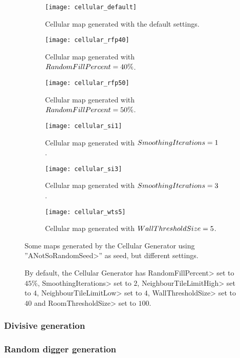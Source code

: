 \begin{figure}[tp]
	\centering
  	\begin{subfigure}[t]{0.325\linewidth}
		\texttt{[image: cellular\_default]}
     		\caption{Cellular map generated with the default settings.}
 	\end{subfigure}
  	\begin{subfigure}[t]{0.325\linewidth}
    		\texttt{[image: cellular\_rfp40]}
    		\caption{Cellular map generated with $Ran\-dom\-Fill\-Per\-cent = 40\%$.}
  	\end{subfigure}
  	\begin{subfigure}[t]{0.325\linewidth}
    		\texttt{[image: cellular\_rfp50]}
    		\caption{Cellular map generated with $Ran\-dom\-Fill\-Per\-cent = 50\%$.}
  	\end{subfigure}
  	\begin{subfigure}[t]{0.325\linewidth}
		\texttt{[image: cellular\_si1]}
     		\caption{Cellular map generated with $Smooth\-ing\-It\-er\-a\-tions = 1$.}
 	\end{subfigure}
  	\begin{subfigure}[t]{0.325\linewidth}
    		\texttt{[image: cellular\_si3]}
     		\caption{Cellular map generated with $Smooth\-ing\-It\-er\-a\-tions = 3$.}
  	\end{subfigure}
  	\begin{subfigure}[t]{0.325\linewidth}
    		\texttt{[image: cellular\_wts5]}
     		\caption{Cellular map generated with $Wall\-Thresh\-old\-Size = 5$.}
  	\end{subfigure}	
	\caption{Some maps generated by the Cellular Generator using ''\<ANotSoRandomSeed>'' as seed, but different settings.}
	\caption*{By default, the Cellular Generator has \<RandomFillPercent> set to $45\%$, \<SmoothingIterations> set to $2$,  \<NeighbourTileLimitHigh> set to $4$,  \<NeighbourTileLimitLow> set to $4$,  \<WallThresholdSize> set to $40$ and \<RoomThresholdSize> set to $100$.}
	\label{fig:cellulars}
\end{figure}


\subsubsection{Divisive generation}

\subsubsection{Random digger generation}

